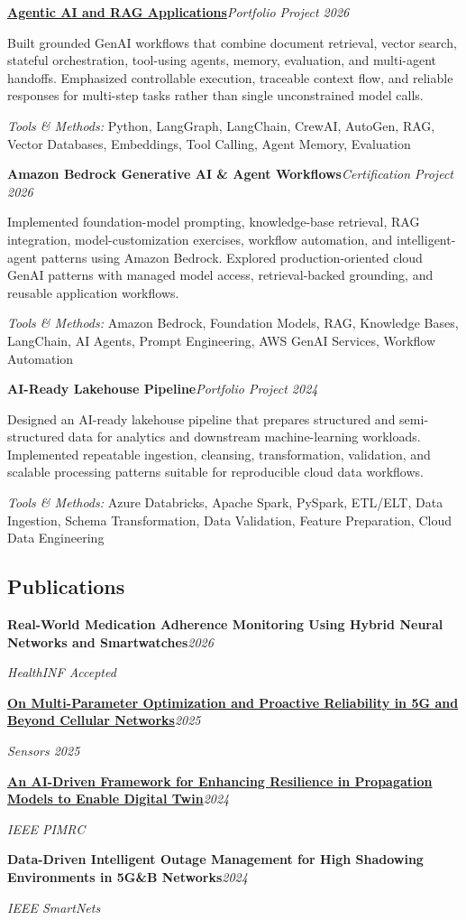 \documentclass[9pt,letterpaper]{extarticle}
\newcommand{\entry}[2]{\Needspace{4\baselineskip}\textbf{#1}\hfill\textit{#2}\par}
\begin{document}
\entry{\href{https://github.com/WaseemRaza844/agentic-ai-projects-by-was}{Agentic AI and RAG Applications}}{Portfolio Project \textbar{} 2026}
Built grounded GenAI workflows that combine document retrieval, vector search, stateful orchestration, tool-using agents, memory, evaluation, and multi-agent handoffs. Emphasized controllable execution, traceable context flow, and reliable responses for multi-step tasks rather than single unconstrained model calls.\par
{\small\textit{Tools \& Methods:} Python, LangGraph, LangChain, CrewAI, AutoGen, RAG, Vector Databases, Embeddings, Tool Calling, Agent Memory, Evaluation\par}
\vspace{1pt}
\entry{Amazon Bedrock Generative AI \& Agent Workflows}{Certification Project \textbar{} 2026}
Implemented foundation-model prompting, knowledge-base retrieval, RAG integration, model-customization exercises, workflow automation, and intelligent-agent patterns using Amazon Bedrock. Explored production-oriented cloud GenAI patterns with managed model access, retrieval-backed grounding, and reusable application workflows.\par
{\small\textit{Tools \& Methods:} Amazon Bedrock, Foundation Models, RAG, Knowledge Bases, LangChain, AI Agents, Prompt Engineering, AWS GenAI Services, Workflow Automation\par}
\vspace{1pt}
\entry{AI-Ready Lakehouse Pipeline}{Portfolio Project \textbar{} 2024}
Designed an AI-ready lakehouse pipeline that prepares structured and semi-structured data for analytics and downstream machine-learning workloads. Implemented repeatable ingestion, cleansing, transformation, validation, and scalable processing patterns suitable for reproducible cloud data workflows.\par
{\small\textit{Tools \& Methods:} Azure Databricks, Apache Spark, PySpark, ETL/ELT, Data Ingestion, Schema Transformation, Data Validation, Feature Preparation, Cloud Data Engineering\par}
\vspace{1pt}
\subsection{Publications}
\entry{Real-World Medication Adherence Monitoring Using Hybrid Neural Networks and Smartwatches}{2026}
\textit{HealthINF \textbar{} Accepted}\par
\entry{\href{https://doi.org/10.3390/s25247651}{On Multi-Parameter Optimization and Proactive Reliability in 5G and Beyond Cellular Networks}}{2025}
\textit{Sensors 2025}\par
\entry{\href{https://doi.org/10.1109/PIMRC59610.2024.10817403}{An AI-Driven Framework for Enhancing Resilience in Propagation Models to Enable Digital Twin}}{2024}
\textit{IEEE PIMRC}\par
\entry{Data-Driven Intelligent Outage Management for High Shadowing Environments in 5G\&B Networks}{2024}
\textit{IEEE SmartNets}\par
{}
\end{document}
